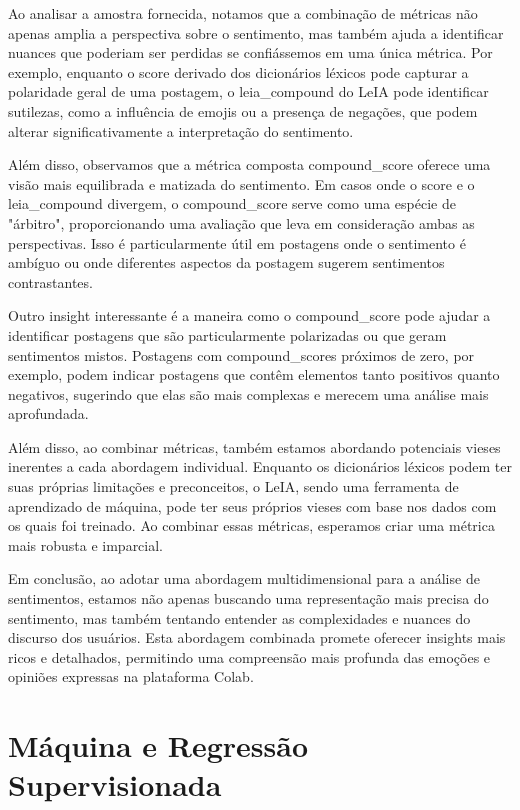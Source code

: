 Ao analisar a amostra fornecida, notamos que a combinação de métricas não apenas amplia a perspectiva sobre o sentimento, mas também ajuda a identificar nuances que poderiam ser perdidas se confiássemos em uma única métrica. Por exemplo, enquanto o score derivado dos dicionários léxicos pode capturar a polaridade geral de uma postagem, o leia\_compound do LeIA pode identificar sutilezas, como a influência de emojis ou a presença de negações, que podem alterar significativamente a interpretação do sentimento.

Além disso, observamos que a métrica composta compound\_score oferece uma visão mais equilibrada e matizada do sentimento. Em casos onde o score e o leia\_compound divergem, o compound\_score serve como uma espécie de "árbitro", proporcionando uma avaliação que leva em consideração ambas as perspectivas. Isso é particularmente útil em postagens onde o sentimento é ambíguo ou onde diferentes aspectos da postagem sugerem sentimentos contrastantes.

Outro insight interessante é a maneira como o compound\_score pode ajudar a identificar postagens que são particularmente polarizadas ou que geram sentimentos mistos. Postagens com compound\_scores próximos de zero, por exemplo, podem indicar postagens que contêm elementos tanto positivos quanto negativos, sugerindo que elas são mais complexas e merecem uma análise mais aprofundada.

Além disso, ao combinar métricas, também estamos abordando potenciais vieses inerentes a cada abordagem individual. Enquanto os dicionários léxicos podem ter suas próprias limitações e preconceitos, o LeIA, sendo uma ferramenta de aprendizado de máquina, pode ter seus próprios vieses com base nos dados com os quais foi treinado. Ao combinar essas métricas, esperamos criar uma métrica mais robusta e imparcial.

Em conclusão, ao adotar uma abordagem multidimensional para a análise de sentimentos, estamos não apenas buscando uma representação mais precisa do sentimento, mas também tentando entender as complexidades e nuances do discurso dos usuários. Esta abordagem combinada promete oferecer insights mais ricos e detalhados, permitindo uma compreensão mais profunda das emoções e opiniões expressas na plataforma Colab.

\section{Máquina e Regressão Supervisionada}

